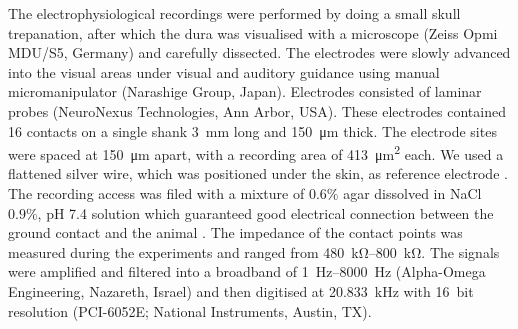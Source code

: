 The electrophysiological recordings were performed by doing a small skull trepanation, after which the dura was visualised with a microscope (Zeiss Opmi MDU/S5, Germany) and carefully dissected.
The electrodes were slowly advanced into the visual areas under visual and auditory guidance using manual micromanipulator (Narashige Group, Japan).
Electrodes consisted of laminar probes (NeuroNexus Technologies, Ann Arbor, USA).
These electrodes contained \num{16} contacts on a single shank \SI{3}{\milli\metre} long and \SI{150}{\micro\metre} thick.
The electrode sites were spaced at \SI{150}{\micro\metre} apart, with a recording area of \SI{413}{\micro\metre^2} each.
We used a flattened silver wire, which was positioned under the skin, as reference electrode \citep{Murayama2010}.
The recording access was filed with a mixture of $0.6\%$ agar dissolved in \ac{NaCl} $0.9\%$, pH 7.4 solution which guaranteed good electrical connection between the ground contact and the animal \citep{Oeltermann2007760}.
The impedance of the contact points was measured during the experiments and ranged from \SIrange{480}{800}{\kilo\ohm}.
The signals were amplified and filtered into a broadband of \SIrange{1}{8000}{Hz} (Alpha-Omega Engineering, Nazareth, Israel) and then digitised at \SI{20.833}{\kilo\Hz} with \SI{16}{bit} resolution (PCI-6052E; National Instruments, Austin, TX).


